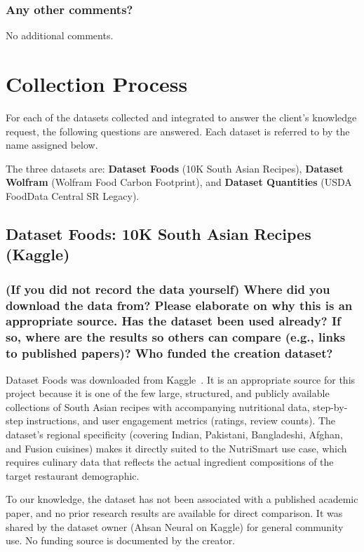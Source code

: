 \documentclass{article}
\newcommand{\question}[1]{#1}
\begin{document}
\question{\subsubsection*{Any other comments?}}
No additional comments.


\section{Collection Process}

For each of the datasets collected and integrated to answer the client's knowledge request, the following questions are answered. Each dataset is referred to by the name assigned below.

The three datasets are: \textbf{Dataset Foods} (10K South Asian Recipes), \textbf{Dataset Wolfram} (Wolfram Food Carbon Footprint), and \textbf{Dataset Quantities} (USDA FoodData Central SR Legacy).

\subsection*{Dataset Foods: 10K South Asian Recipes (Kaggle)}

\question{\subsubsection*{(If you did not record the data yourself) Where did you download the data from? Please elaborate on why this is an appropriate source. Has the dataset been used already? If so, where are the results so others can compare (e.g., links to published papers)? Who funded the creation dataset?}}

Dataset Foods was downloaded from Kaggle~\cite{kaggle_southasian}. It is an appropriate source for this project because it is one of the few large, structured, and publicly available collections of South Asian recipes with accompanying nutritional data, step-by-step instructions, and user engagement metrics (ratings, review counts). The dataset's regional specificity (covering Indian, Pakistani, Bangladeshi, Afghan, and Fusion cuisines) makes it directly suited to the NutriSmart use case, which requires culinary data that reflects the actual ingredient compositions of the target restaurant demographic.

To our knowledge, the dataset has not been associated with a published academic paper, and no prior research results are available for direct comparison. It was shared by the dataset owner (Ahsan Neural on Kaggle) for general community use. No funding source is documented by the creator.
\end{document}
